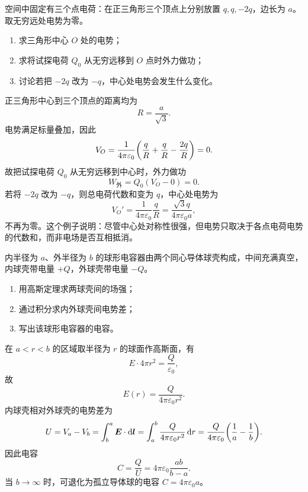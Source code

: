 \begin{competition}
空间中固定有三个点电荷：在正三角形三个顶点上分别放置 $q,q,-2q$，边长为 $a$。取无穷远处电势为零。
\begin{enumerate}
  \item 求三角形中心 $O$ 处的电势；
  \item 求将试探电荷 $Q_0$ 从无穷远移到 $O$ 点时外力做功；
  \item 讨论若把 $-2q$ 改为 $-q$，中心处电势会发生什么变化。
\end{enumerate}

\begin{solution}
正三角形中心到三个顶点的距离均为
\[
R=\frac{a}{\sqrt{3}}.
\]
电势满足标量叠加，因此
\[
V_O=\frac{1}{4\pi\varepsilon_0}\qty(\frac{q}{R}+\frac{q}{R}-\frac{2q}{R})=0.
\]
故把试探电荷 $Q_0$ 从无穷远移到中心时，外力做功
\[
W_{\text{外}}=Q_0(V_O-0)=0.
\]
若将 $-2q$ 改为 $-q$，则总电荷代数和变为 $q$，中心处电势为
\[
V_O'=\frac{1}{4\pi\varepsilon_0}\frac{q}{R}
=\frac{\sqrt{3}q}{4\pi\varepsilon_0 a},
\]
不再为零。这个例子说明：尽管中心处对称性很强，但电势只取决于各点电荷电势的代数和，而非电场是否互相抵消。
\end{solution}
\end{competition}

\begin{competition}
内半径为 $a$、外半径为 $b$ 的球形电容器由两个同心导体球壳构成，中间充满真空，内球壳带电量 $+Q$，外球壳带电量 $-Q$。
\begin{enumerate}
  \item 用高斯定理求两球壳间的场强；
  \item 通过积分求内外球壳间电势差；
  \item 写出该球形电容器的电容。
\end{enumerate}

\begin{solution}
在 $a<r<b$ 的区域取半径为 $r$ 的球面作高斯面，有
\[
E\cdot 4\pi r^2=\frac{Q}{\varepsilon_0},
\]
故
\[
E(r)=\frac{Q}{4\pi\varepsilon_0 r^2}.
\]
内球壳相对外球壳的电势差为
\[
U=V_a-V_b=\int_b^a \vb*{E}\cdot \dd{\vb*{l}}
=\int_a^b \frac{Q}{4\pi\varepsilon_0 r^2}\dd{r}
=\frac{Q}{4\pi\varepsilon_0}\qty(\frac{1}{a}-\frac{1}{b}).
\]
因此电容
\[
C=\frac{Q}{U}=4\pi\varepsilon_0\frac{ab}{b-a}.
\]
当 $b\to \infty$ 时，可退化为孤立导体球的电容 $C=4\pi\varepsilon_0 a$。
\end{solution}
\end{competition}

